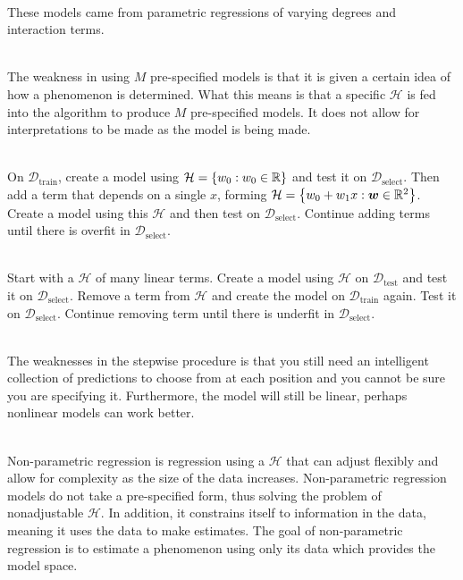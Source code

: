\documentclass[12pt]{article}
\begin{document}
\begin{enumerate}

 \\ These models came from parametric regressions of varying degrees and interaction terms. 

 \\ The weakness in using $M$ pre-specified models is that it is given a certain idea of how a phenomenon is determined. What this means is that a specific $\mathcal{H}$ is fed into the algorithm to produce $M$ pre-specified models. It does not allow for interpretations to be made as the model is being made. 

 \\ On $\mathcal{D}_{\text{train}}$, create a model using $\mathcal{H} = \left\{w_0: w_0 \in \mathbb{R}\right\}$ and test it on $\mathcal{D}_{\text{select}}$. Then add a term that depends on a single $x$, forming $\mathcal{H} = \left\{w_0 + w_1x: \boldsymbol{w} \in \mathbb{R}^2\right\}$. Create a model using this $\mathcal{H}$ and then test on $\mathcal{D}_{\text{select}}$. Continue adding terms until there is overfit in $\mathcal{D}_{\text{select}}$. 

 \\
Start with a $\mathcal{H}$ of many linear terms. Create a model using $\mathcal{H}$ on $\mathcal{D}_{\text{test}}$ and test it on $\mathcal{D}_{\text{select}}$. Remove a term from $\mathcal{H}$ and create the model on $\mathcal{D}_{\text{train}}$ again. Test it on $\mathcal{D}_{\text{select}}$. Continue removing term until there is underfit in $\mathcal{D}_{\text{select}}$. 

 \\ The weaknesses in the stepwise procedure is that you still need an intelligent collection of predictions to choose from at each position and you cannot be sure you are specifying it. Furthermore, the model will still be linear, perhaps nonlinear models can work better. 

 \\
Non-parametric regression is regression using a $\mathcal{H}$ that can adjust flexibly and allow for complexity as the size of the data increases. Non-parametric regression models do not take a pre-specified form, thus solving the problem of nonadjustable $\mathcal{H}$. In addition, it constrains itself to information in the data, meaning it uses the data to make estimates. The goal of non-parametric regression is to estimate a phenomenon using only its data which provides the model space. 


\end{enumerate}
\end{document}

